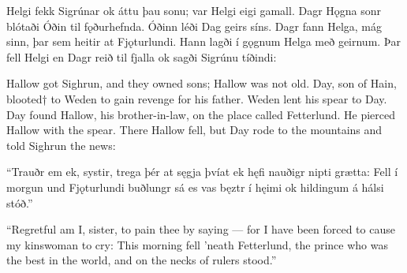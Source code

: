 Helgi fekk Sigrúnar ok áttu þau sonu; var Helgi eigi gamall. Dagr Hǫgna sonr blótaði Óðin til fǫðurhefnda. Óðinn léði Dag geirs síns. Dagr fann Helga, mág sinn, þar sem heitir at Fjǫturlundi. Hann lagði í gǫgnum Helga með geirnum. Þar fell Helgi en Dagr reið til fjalla ok sagði Sigrúnu tíðindi: 

Hallow got Sighrun, and they owned sons; Hallow was not old. Day, son of Hain, blooted† to Weden to gain revenge for his father. Weden lent his spear to Day. Day found Hallow, his brother-in-law, on the place called Fetterlund. He pierced Hallow with the spear. There Hallow fell, but Day rode to the mountains and told Sighrun the news:

“Trauðr em ek, systir, \hld trega þér at sęgja
þvíat ek hęfi nauðigr \hld nipti grætta:
Fell í morgun \hld und Fjǫturlundi
buðlungr sá es vas \hld bęztr í hęimi
ok hildingum \hld á hálsi stóð.”

“Regretful am I, sister, to pain thee by saying — for I have been forced to cause my kinswoman to cry: This morning fell 'neath Fetterlund, the prince who was the best in the world, and on the necks of rulers stood.”
